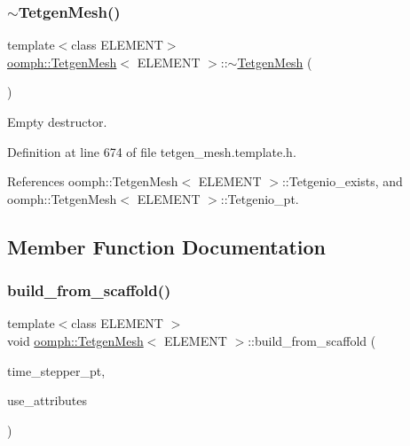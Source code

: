 \mbox{\label{classoomph_1_1TetgenMesh_a9a83c64b6481463161f6eb87f347ee9e}} 
\subsubsection{\texorpdfstring{$\sim$\+Tetgen\+Mesh()}{~TetgenMesh()}}
{\footnotesize\ttfamily template$<$class E\+L\+E\+M\+E\+NT$>$ \\
\hyperlink{classoomph_1_1TetgenMesh}{oomph\+::\+Tetgen\+Mesh}$<$ E\+L\+E\+M\+E\+NT $>$\+::$\sim$\hyperlink{classoomph_1_1TetgenMesh}{Tetgen\+Mesh} (\begin{DoxyParamCaption}{ }\end{DoxyParamCaption})\hspace{0.3cm}{\ttfamily [inline]}}



Empty destructor. 



Definition at line 674 of file tetgen\+\_\+mesh.\+template.\+h.



References oomph\+::\+Tetgen\+Mesh$<$ E\+L\+E\+M\+E\+N\+T $>$\+::\+Tetgenio\+\_\+exists, and oomph\+::\+Tetgen\+Mesh$<$ E\+L\+E\+M\+E\+N\+T $>$\+::\+Tetgenio\+\_\+pt.



\subsection{Member Function Documentation}
\mbox{\label{classoomph_1_1TetgenMesh_a3b0d214cb14243f7ecc2c82e6641930b}} 
\subsubsection{\texorpdfstring{build\+\_\+from\+\_\+scaffold()}{build\_from\_scaffold()}}
{\footnotesize\ttfamily template$<$class E\+L\+E\+M\+E\+NT $>$ \\
void \hyperlink{classoomph_1_1TetgenMesh}{oomph\+::\+Tetgen\+Mesh}$<$ E\+L\+E\+M\+E\+NT $>$\+::build\+\_\+from\+\_\+scaffold (\begin{DoxyParamCaption}\item[{Time\+Stepper $\ast$}]{time\+\_\+stepper\+\_\+pt,  }\item[{const bool \&}]{use\+\_\+attributes }\end{DoxyParamCaption})\hspace{0.3cm}{\ttfamily [protected]}}



